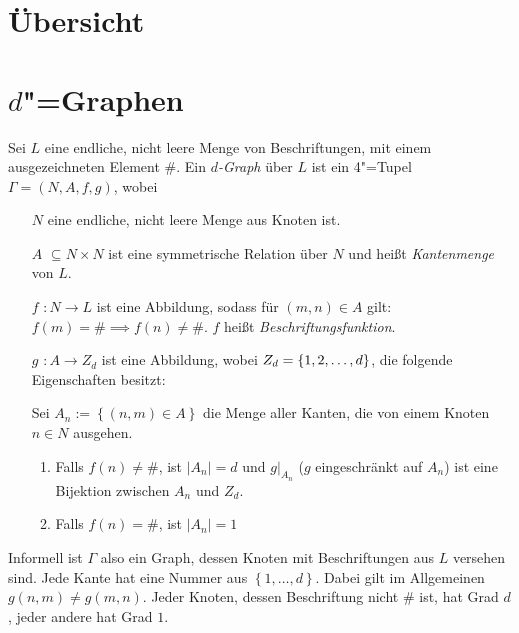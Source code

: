 \documentclass[11pt]{article}
\newcommand{\defWord}[1]{\emph{#1}}
\begin{document}
\clearpage


\section{Übersicht}

\section{$d$"=Graphen}
\begin{definition}
Sei $L$ eine endliche, nicht leere Menge von Beschriftungen, mit einem ausgezeichneten Element $\#$. 
Ein \defWord{$d$-Graph} über $L$ ist ein 4"=Tupel $\Gamma = \left(N, A, f, g\right)$, wobei
\begin{itemize}
	\item[$N$] eine endliche, nicht leere Menge aus Knoten ist.
	\item[$A$] $\subseteq N \times N$ ist eine symmetrische Relation über $N$ und heißt \defWord{Kantenmenge} von $L$.
	\item[$f$] $: N \rightarrow L$ ist eine Abbildung, sodass für $\left(m, n\right) \in A$ gilt: $f\left(m\right) = \# \implies f\left(n\right) \neq \#$. $f$  heißt \defWord{Beschriftungsfunktion}.
	\item[$g$] $: A \rightarrow Z_d$ ist eine Abbildung, wobei $Z_d = \left \{1, 2,\text{\dots}, d \right \}$, die folgende Eigenschaften besitzt:
	
	Sei $A_n := \left \{\left(n, m\right) \in A\right \}$ die Menge aller Kanten, die von einem Knoten $n \in N$ ausgehen.
	\begin{enumerate}
		\item Falls $f\left(n\right) \neq \#$, ist $\left|A_n\right| = d$ und $g \vert_{A_n}$ ($g$ eingeschränkt auf $A_n$) ist eine Bijektion zwischen $A_n$ und $Z_d$.
		\item Falls $f\left(n\right) = \#$, ist $\left|A_n\right| = 1$
	\end{enumerate}
	
\end{itemize}
\end{definition}

Informell ist $\Gamma$ also ein Graph, dessen Knoten mit Beschriftungen aus $L$ versehen sind. Jede Kante hat eine Nummer aus $\left\{1, \dots, d\right\}$. Dabei gilt im Allgemeinen $g\left(n, m\right) \neq g\left(m, n\right)$. Jeder Knoten, dessen Beschriftung nicht $\#$ ist, hat Grad $d$, jeder andere hat Grad $1$. 
\end{document}
